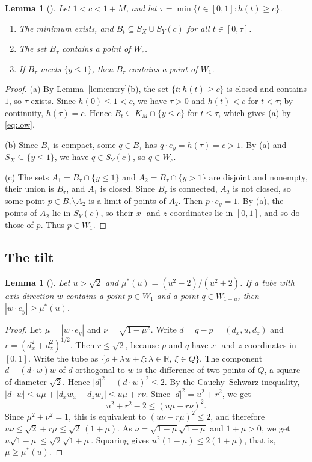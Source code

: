 \documentclass[11pt]{amsart}
\newtheorem{lemma}[theorem]{Lemma}
\theoremstyle{definition}
\theoremstyle{remark}
\numberwithin{equation}{section}
\newcommand{\R}{\mathbb{R}}
\begin{document}
\begin{lemma}[{\cite[Lemmas~3.4 and~3.5]{Tan26a}}]\label{lem:event}
Let $1<c<1+M$, and let $\tau=\min\{t\in[0,1]:h(t)\ge c\}$.
\begin{enumerate}[label=(\alph*)]
\item The minimum exists, and $B_t\subseteq S_X\cup S_Y(c)$ for all $t\in[0,\tau]$.
\item The set $B_\tau$ contains a point of $W_c$.
\item If $B_\tau$ meets $\{y\le1\}$, then $B_\tau$ contains a point of $W_1$.
\end{enumerate}
\end{lemma}

\begin{proof}
(a) By Lemma~\ref{lem:entry}(b), the set $\{t:h(t)\ge c\}$ is closed and contains $1$, so $\tau$ exists. Since $h(0)\le1<c$, we have $\tau>0$ and $h(t)<c$ for $t<\tau$; by continuity, $h(\tau)=c$. Hence $B_t\subseteq K_M\cap\{y\le c\}$ for $t\le\tau$, which gives (a) by \eqref{eq:low}.

(b) Since $B_\tau$ is compact, some $q\in B_\tau$ has $q\cdot e_y=h(\tau)=c>1$. By (a) and $S_X\subseteq\{y\le1\}$, we have $q\in S_Y(c)$, so $q\in W_c$.

(c) The sets $A_1=B_\tau\cap\{y\le1\}$ and $A_2=B_\tau\cap\{y>1\}$ are disjoint and nonempty, their union is $B_\tau$, and $A_1$ is closed. Since $B_\tau$ is connected, $A_2$ is not closed, so some point $p\in B_\tau\setminus A_2$ is a limit of points of $A_2$. Then $p\cdot e_y=1$. By (a), the points of $A_2$ lie in $S_Y(c)$, so their $x$- and $z$-coordinates lie in $[0,1]$, and so do those of $p$. Thus $p\in W_1$.
\end{proof}

\subsection{The tilt}

\begin{lemma}[{\cite[Lemma~5.1]{Tan26a}}]\label{lem:tilt}
Let $u>\sqrt2$ and $\mu^*(u)=(u^2-2)/(u^2+2)$. If a tube with axis direction $w$ contains a point $p\in W_1$ and a point $q\in W_{1+u}$, then $|w\cdot e_y|\ge\mu^*(u)$.
\end{lemma}

\begin{proof}
Let $\mu=|w\cdot e_y|$ and $\nu=\sqrt{1-\mu^2}$. Write $d=q-p=(d_x,u,d_z)$ and $r=(d_x^2+d_z^2)^{1/2}$. Then $r\le\sqrt2$, because $p$ and $q$ have $x$- and $z$-coordinates in $[0,1]$. Write the tube as $\{\rho+\lambda w+\xi:\lambda\in\R,\ \xi\in Q\}$. The component $d-(d\cdot w)w$ of $d$ orthogonal to $w$ is the difference of two points of $Q$, a square of diameter $\sqrt2$. Hence $|d|^2-(d\cdot w)^2\le2$. By the Cauchy--Schwarz inequality, $|d\cdot w|\le u\mu+|d_xw_x+d_zw_z|\le u\mu+r\nu$. Since $|d|^2=u^2+r^2$, we get
\[
u^2+r^2-2\le(u\mu+r\nu)^2.
\]
Since $\mu^2+\nu^2=1$, this is equivalent to $(u\nu-r\mu)^2\le2$, and therefore $u\nu\le\sqrt2+r\mu\le\sqrt2\,(1+\mu)$. As $\nu=\sqrt{1-\mu}\sqrt{1+\mu}$ and $1+\mu>0$, we get $u\sqrt{1-\mu}\le\sqrt2\sqrt{1+\mu}$. Squaring gives $u^2(1-\mu)\le2(1+\mu)$, that is, $\mu\ge\mu^*(u)$.
\end{proof}
\end{document}
